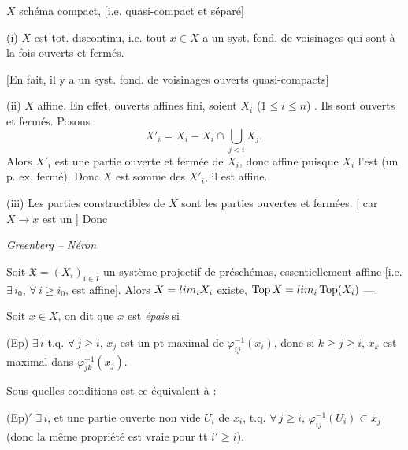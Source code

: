 \documentclass[11pt,a4paper]{article}
\begin{document}

$X$ schéma compact, [i.e. quasi-compact et séparé]

(i) $X$ est tot. discontinu,  i.e. tout $x \in X$ a un syst. fond. de voisinages qui sont à la fois ouverts et fermés.

[En fait, il y a un syst. fond. de voisinages ouverts quasi-compacts]

(ii) $X$  affine. En effet,  \struck{\ill{} \ill{}} ouverts affines  fini, soient $X_i$ ($1 \leq i \leq n$)  \struck{\ill{}}. Ils sont ouverts et fermés. Posons
\[
  X'_i = X_i - X_i \cap \bigcup_{j<i} X_j ,
\]
Alors $X'_i$ est une partie ouverte et fermée de $X_i$, donc affine puisque $X_i$ l'est (un \ill{} p. ex. \ill{} \ill{} \ill{} \ill{} fermé). Donc $X$ \struck{\ill{}} est somme des $X'_i$, il est affine.

(iii) Les parties constructibles de $X$ sont les \ill{} parties ouvertes et fermées. [  car $X \to x$ est un \struck{\ill{}} ] Donc

\emph{Greenberg -- Néron}

Soit $\mathfrak{X} = (X_i)_{i \in I}$ un système projectif de préschémas, essentiellement affine [i.e. $\exists\, i_0$, $\forall\, i \geq i_0$,  est affine]. Alors $X = \varprojlim_i X_i$ existe, $\operatorname{Top} X = \varprojlim_i \operatorname{Top}(X_i)$ ---.

Soit $x \in X$, on dit que $x$ est \emph{épais} si

(Ep) $\exists\, i$ t.q. $\forall\, j \geq i$, $x_j$ est un pt maximal de $\varphi_{ij}^{-1}(x_i)$, donc si $k \geq j \geq i$, \struck{\ill{}} $x_k$ est maximal dans $\varphi_{jk}^{-1}(x_j)$.

Sous quelles conditions est-ce équivalent à :

(Ep)$'$ $\exists\, i$,  et une partie ouverte non vide $U_i$ de $\bar{x}_i$, t.q. $\forall\, j \geq i$, $\varphi_{ij}^{-1}(U_i) \subset \bar{x}_j$ (donc la même propriété est vraie pour tt $i' \geq i$).
\end{document}
